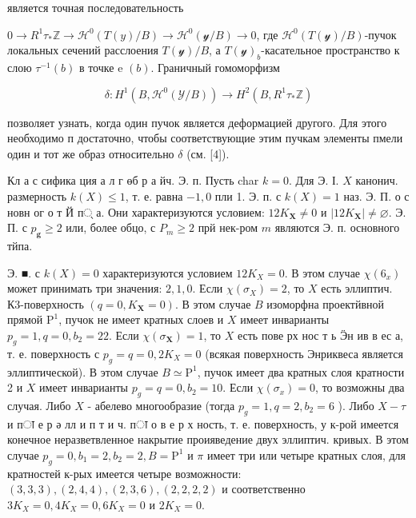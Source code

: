 \documentclass[10pt]{article}
\begin{document}
является точная последовательность



$0 \longrightarrow R^{1} \tau_{*} \mathbb{Z} \longrightarrow \mathscr{H}^{0}(T(y) / B) \rightarrow \mathscr{H}^{0}(\mathscr{y} / B) \rightarrow 0$, где $\mathscr{H}^{0}(T(\mathscr{y}) / B)$-пучок локальных сечений расслоения $T(\mathcal{y}) / B$, а $T(\mathcal{y})_{b}$-касательное пространство к слою $\tau^{-1}(b)$ в точке e $(b)$. Граничный гомоморфизм



\[

\delta: H^{1}\left(B, \mathscr{H}^{0}(\mathcal{Y} / B)\right) \rightarrow H^{2}\left(B, R^{1} \tau_{*} \mathbb{Z}\right)

\]



позволяет узнать, когда один пучок является деформацией другого. Для этого необходимо п достаточно, чтобы соответствующие этим пучкам элементы пмели один и тот же образ относительно $\delta$ (см. [4]).



Кл а с сифика ция а л г өб р а йч. Э. п. Пусть char $k=0$. Для Э. І. $X$ канонич. размерность $k(X) \leqslant 1$, т. е. равна $-1,0$ пли 1. Э. п. с $k(X)=1$ наз. Э. П. о с новн ог о т Й п् а. Они характеризуются условием: $12 K_{\boldsymbol{X}} \neq 0$ и $\left|12 K_{\boldsymbol{X}}\right| \neq \varnothing$. Э. П. с $p_{\boldsymbol{g}} \geqslant 2$ или, более обцо, с $P_{m} \geqslant 2$ прй нек-ром $m$ являются Э. п. основного тйпа.



Э. ■. с $k(X)=0$ характеризуются условием $12 K_{X}=0$. В этом случае $\chi\left(6_{x}\right)$ может принимать три значения: $2,1,0$. Если $\chi\left(\sigma_{X}\right)=2$, то $X$ есть эллиптич. К3-поверхность $\left(q=0, K_{\boldsymbol{X}}=0\right)$. В этом случае $B$ изоморфна проектйвной прямой $\mathrm{P}^{1}$, пучок не имеет кратных слоев и $X$ имеет инварианты $p_{g}=1, q=0, b_{2}=22$. Если $\chi\left(\sigma_{\boldsymbol{X}}\right)=1$, то $X$ есть пове рх нос т ь Ӭн ив в ес а, т. е. поверхность с $p_{g}=q=0,2 K_{X}=0$ (всякая поверхность Энриквеса является эллиптической). В этом случае $B \simeq \mathrm{P}^{1}$, пучок имеет два кратных слоя кратности 2 и $X$ имеет инварианты $p_{g}=q=0, b_{2}=10$. Если $\chi\left(\sigma_{x}\right)=0$, то возможны два случая. Либо $X$ - абелево многообразие (тогда $p_{g}=1, q=2, b_{2}=6$ ). Либо $X-\tau$ и пा е р ә лл и п т и ч. пा о в е р х ность, т. е. поверхность, у к-рой имеется конечное неразветвленное накрытие проияведение двух эллиптич. кривых. В этом случае $p_{g}=0, b_{1}=2, b_{2}=2, B=\mathrm{P}^{1}$ и $\pi$ имеет три или четыре кратных слоя, для кратностей к-рых имеется четыре возможности: $(3,3,3),(2,4,4),(2,3,6),(2,2,2,2)$ и соответственно $3 K_{X}=0,4 K_{X}=0,6 K_{X}=0$ и $2 K_{X}=0$.
\end{document}
